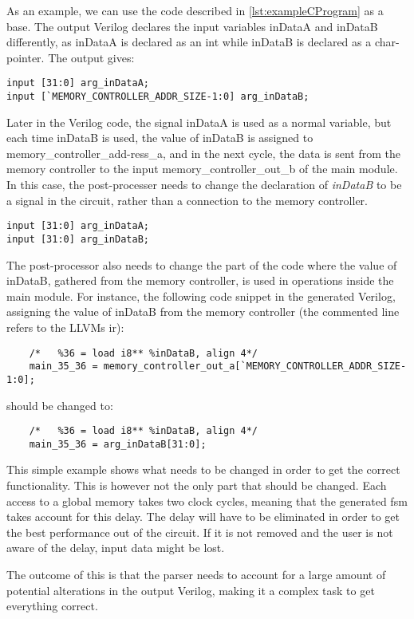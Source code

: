 As an example, we can use the code described in \cref{lst:exampleCProgram} as a base. The output Verilog declares the input variables inDataA and inDataB differently, as inDataA is declared as an int while inDataB is declared as a char-pointer. The output gives:
\lstset{language=Verilog, style=Verilogstyle}
\begin{lstlisting}
input [31:0] arg_inDataA;
input [`MEMORY_CONTROLLER_ADDR_SIZE-1:0] arg_inDataB;
\end{lstlisting}
Later in the Verilog code, the signal inDataA is used as a normal variable, but each time inDataB is used, the value of inDataB is assigned to memory\_controller\_add-ress\_a, and in the next cycle, the data is sent from the memory controller to the input memory\_controller\_out\_b of the main module. In this case, the post-processer needs to change the declaration of \textit{inDataB} to be a signal in the circuit, rather than a connection to the memory controller. 
\begin{lstlisting}
input [31:0] arg_inDataA;
input [31:0] arg_inDataB;
\end{lstlisting}
The post-processor also needs to change the part of the code where the value of inDataB, gathered from the memory controller, is used in operations inside the main module. For instance, the following code snippet in the generated Verilog, assigning the value of inDataB from the memory controller (the commented line refers to the LLVMs \gls{ir}):
\begin{lstlisting}
	/*   %36 = load i8** %inDataB, align 4*/
	main_35_36 = memory_controller_out_a[`MEMORY_CONTROLLER_ADDR_SIZE-1:0];
\end{lstlisting}
should be changed to:
\begin{lstlisting}
	/*   %36 = load i8** %inDataB, align 4*/
	main_35_36 = arg_inDataB[31:0];
\end{lstlisting}
This simple example shows what needs to be changed in order to get the correct functionality. This is however not the only part that should be changed. Each access to a global memory takes two clock cycles, meaning that the generated \gls{fsm} takes account for this delay. The delay will have to be eliminated in order to get the best performance out of the circuit. If it is not removed and the user is not aware of the delay, input data might be lost.

The outcome of this is that the parser needs to account for a large amount of potential alterations in the output Verilog, making it a complex task to get everything correct.

